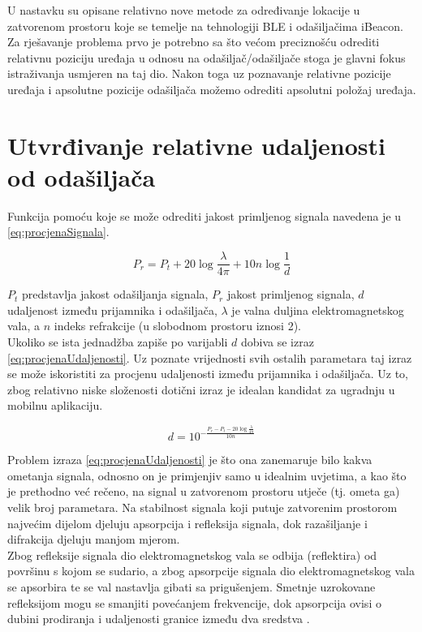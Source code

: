 U nastavku su opisane relativno nove metode za određivanje lokacije u zatvorenom prostoru koje se temelje na tehnologiji BLE i odašiljačima iBeacon.
Za rješavanje problema prvo je potrebno sa što većom preciznošću odrediti relativnu poziciju uređaja u odnosu na odašiljač/odašiljače stoga je glavni fokus istraživanja usmjeren na taj dio. 
Nakon toga uz poznavanje relativne pozicije uređaja i apsolutne pozicije odašiljača možemo odrediti apsolutni položaj uređaja.

\section{Utvrđivanje relativne udaljenosti od odašiljača}

Funkcija pomoću koje se može odrediti jakost primljenog signala navedena je u \eqref{eq:procjenaSignala}.

\begin{equation}
	\label{eq:procjenaSignala}
	P_r = P_t + 20\log{\frac{\lambda}{4\pi}} + 10n\log{\frac{1}{d}}
\end{equation}

$P_t$ predstavlja jakost odašiljanja signala, $P_r$ jakost primljenog signala, $d$ udaljenost između prijamnika i odašiljača, $\lambda$ je valna duljina elektromagnetskog vala, a $n$ indeks refrakcije (u slobodnom prostoru iznosi 2).
\\

Ukoliko se ista jednadžba zapiše po varijabli $d$ dobiva se izraz \eqref{eq:procjenaUdaljenosti}. 
Uz poznate vrijednosti svih ostalih parametara taj izraz se može iskoristiti za procjenu udaljenosti između prijamnika i odašiljača.
Uz to, zbog relativno niske složenosti dotični izraz je idealan kandidat za ugradnju u mobilnu aplikaciju.

\begin{equation}
	\label{eq:procjenaUdaljenosti}
	d = 10^{-\frac{P_r - P_t - 20\log{\frac{\lambda}{4\pi}}}{10n}}
\end{equation}

Problem izraza \eqref{eq:procjenaUdaljenosti} je što ona zanemaruje bilo kakva ometanja signala, odnosno on je primjenjiv samo u idealnim uvjetima, a kao što je prethodno već rečeno, na signal u zatvorenom prostoru utječe (tj. ometa ga) velik broj parametara. 
Na stabilnost signala koji putuje zatvorenim prostorom najvećim dijelom djeluju apsorpcija i refleksija signala, dok razašiljanje i difrakcija djeluju manjom mjerom.
\\
Zbog refleksije signala dio elektromagnetskog vala se odbija (reflektira) od površinu s kojom se sudario, a zbog apsorpcije signala dio elektromagnetskog vala se apsorbira te se val nastavlja gibati sa prigušenjem. 
Smetnje uzrokovane refleksijom mogu se smanjiti povećanjem frekvencije, dok apsorpcija ovisi o dubini prodiranja i udaljenosti granice između dva sredstva \citep{signalCharacteristics}.
\\

